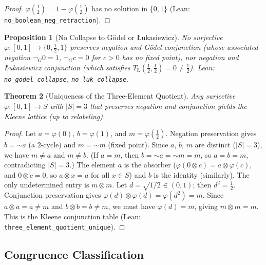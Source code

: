 \documentclass[11pt,a4paper]{article}
\newtheorem{theorem}{Theorem}[section]
\newtheorem{proposition}[theorem]{Proposition}
\newcommand{\negc}{\mathord{\sim}}
\newcommand{\conjc}{\otimes}
\begin{document}
\begin{proof}
$\varphi(\tfrac{1}{2}) = 1 - \varphi(\tfrac{1}{2})$ has no solution
in $\{0, 1\}$
(Lean: \texttt{no\_boolean\_neg\_retraction}).
\end{proof}

\begin{proposition}[No Collapse to G\"odel or \L ukasiewicz]
\label{prop:no-godel-luk}
No surjective $\varphi : [0,1] \to \{0, \tfrac{1}{2}, 1\}$ preserves
negation and G\"odel conjunction (whose associated negation
$\neg_G 0 = 1$, $\neg_G c = 0$ for $c > 0$ has no fixed point),
nor negation and \L ukasiewicz conjunction (which satisfies
$T_{\text{\L}}(\tfrac{1}{2}, \tfrac{1}{2}) = 0 \neq \tfrac{1}{2}$).
Lean: \texttt{no\_godel\_collapse}, \texttt{no\_luk\_collapse}.
\end{proposition}

\begin{theorem}[Uniqueness of the Three-Element Quotient]
\label{thm:quotient-unique}
Any surjective $\varphi : [0,1] \to S$ with $|S| = 3$ that
preserves negation and conjunction yields the Kleene lattice (up to
relabeling).
\end{theorem}

\begin{proof}
Let $a = \varphi(0)$, $b = \varphi(1)$, and $m = \varphi(\tfrac{1}{2})$.
Negation preservation gives $b = \negc a$ (a $2$-cycle) and
$m = \negc m$ (fixed point).
Since $a$, $b$, $m$ are distinct ($|S| = 3$), we have $m \neq a$
and $m \neq b$.
(If $a = m$, then $b = \negc a = \negc m = m$, so $a = b = m$,
contradicting $|S| = 3$.)
The element $a$ is the absorber ($\varphi(0 \conjc c) = a \conjc
\varphi(c)$, and $0 \conjc c = 0$, so $a \conjc x = a$ for all
$x \in S$) and $b$ is the identity (similarly).
The only undetermined entry is $m \conjc m$.
Let $d = \sqrt{1/2} \in (0,1)$; then $d^2 = \tfrac{1}{2}$.
Conjunction preservation gives
$\varphi(d) \conjc \varphi(d) = \varphi(d^2) = m$.
Since $a \conjc a = a \neq m$ and $b \conjc b = b \neq m$, we
must have $\varphi(d) = m$, giving $m \conjc m = m$.
This is the Kleene conjunction table
(Lean: \texttt{three\_element\allowbreak\_quotient\_unique}).
\end{proof}

\subsection{Congruence Classification}
\label{sec:congruence}
\end{document}
